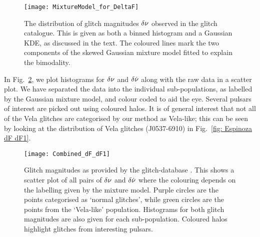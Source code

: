 \documentclass[../full_thesis/full_thesis.tex]{subfiles}
\begin{document}
\begin{figure}[htb]
\centering
\texttt{[image: MixtureModel\_for\_DeltaF]}
\caption{The distribution of glitch magnitudes $\delta\nu$ observed in the
glitch catalogue. This is given as both a binned histogram and a Gaussian
KDE, as discussed in the text. The coloured lines mark the two components of
the skewed Gaussian mixture model fitted to explain the bimodality.}
\label{fig: Delta nu mixture}
\end{figure}

In Fig.~\ref{fig: Espinoza dF dF1}, we plot histograms for $\delta\nu$ and
$\delta\dot{\nu}$ along with the raw data in a scatter plot. We have separated
the data into the individual sub-populations, as labelled by the Gaussian
mixture model, and colour coded to aid the eye. Several pulsars of interest are
picked out using coloured halos. It is of general interest that not all of the
Vela glitches are categorised by our method as Vela-like; this can be seen by
looking at the distribution of Vela glitches (J0537-6910) in Fig.~\ref{fig:
Espinoza dF dF1}.
\begin{figure*}[htb]
\centering
\texttt{[image: Combined\_dF\_dF1]}
\caption{Glitch magnitudes as provided by the glitch-database
         \citep{Espinoza2011}. This shows a scatter plot of all pairs of
         $\delta\nu$ and $\delta\dot{\nu}$ where the colouring depends on the
         labelling given by the mixture model. Purple circles are the
         points categorised as `normal glitches', while green
         circles are the points from the `Vela-like' population. Histograms for
         both glitch magnitudes are also given for each sub-population.
         Coloured halos highlight glitches from interesting pulsars.}
\label{fig: Espinoza dF dF1}
\end{figure*}

\end{document}
